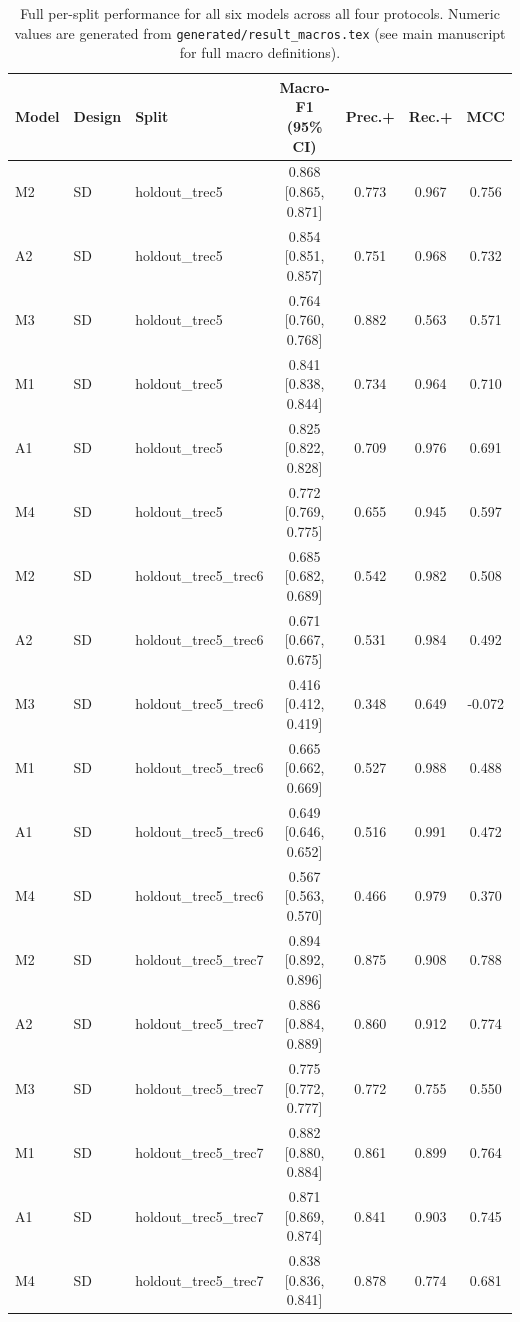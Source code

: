 \documentclass[conference]{IEEEtran}
\begin{document}
\begin{table}[!htbp]
\centering
\footnotesize
\caption{Full per-split performance for all six models across all four protocols. Numeric values are generated from \texttt{generated/result\_macros.tex} (see main manuscript for full macro definitions).}
\label{tab:performance_detail}
\begin{tabular}{lllcccc}
\hline\hline
Model & Design & Split & Macro-F1 (95\% CI) & Prec.+ & Rec.+ & MCC \\
\hline
M2 & SD & holdout\_trec5 & 0.868 [0.865, 0.871] & 0.773 & 0.967 & 0.756 \\
A2 & SD & holdout\_trec5 & 0.854 [0.851, 0.857] & 0.751 & 0.968 & 0.732 \\
M3 & SD & holdout\_trec5 & 0.764 [0.760, 0.768] & 0.882 & 0.563 & 0.571 \\
M1 & SD & holdout\_trec5 & 0.841 [0.838, 0.844] & 0.734 & 0.964 & 0.710 \\
A1 & SD & holdout\_trec5 & 0.825 [0.822, 0.828] & 0.709 & 0.976 & 0.691 \\
M4 & SD & holdout\_trec5 & 0.772 [0.769, 0.775] & 0.655 & 0.945 & 0.597 \\
M2 & SD & holdout\_trec5\_trec6 & 0.685 [0.682, 0.689] & 0.542 & 0.982 & 0.508 \\
A2 & SD & holdout\_trec5\_trec6 & 0.671 [0.667, 0.675] & 0.531 & 0.984 & 0.492 \\
M3 & SD & holdout\_trec5\_trec6 & 0.416 [0.412, 0.419] & 0.348 & 0.649 & -0.072 \\
M1 & SD & holdout\_trec5\_trec6 & 0.665 [0.662, 0.669] & 0.527 & 0.988 & 0.488 \\
A1 & SD & holdout\_trec5\_trec6 & 0.649 [0.646, 0.652] & 0.516 & 0.991 & 0.472 \\
M4 & SD & holdout\_trec5\_trec6 & 0.567 [0.563, 0.570] & 0.466 & 0.979 & 0.370 \\
M2 & SD & holdout\_trec5\_trec7 & 0.894 [0.892, 0.896] & 0.875 & 0.908 & 0.788 \\
A2 & SD & holdout\_trec5\_trec7 & 0.886 [0.884, 0.889] & 0.860 & 0.912 & 0.774 \\
M3 & SD & holdout\_trec5\_trec7 & 0.775 [0.772, 0.777] & 0.772 & 0.755 & 0.550 \\
M1 & SD & holdout\_trec5\_trec7 & 0.882 [0.880, 0.884] & 0.861 & 0.899 & 0.764 \\
A1 & SD & holdout\_trec5\_trec7 & 0.871 [0.869, 0.874] & 0.841 & 0.903 & 0.745 \\
M4 & SD & holdout\_trec5\_trec7 & 0.838 [0.836, 0.841] & 0.878 & 0.774 & 0.681 \\

\end{tabular}
\end{table}
\end{document}
